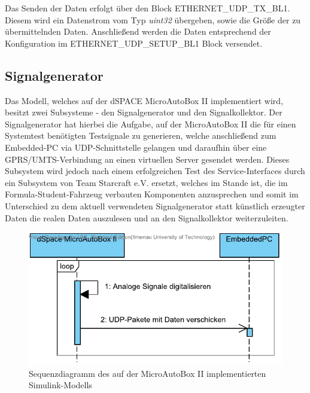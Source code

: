 \documentclass[fontsize = 12pt, paper = a4]{scrreprt}
\begin{document}
\begin{itemize}
Das Senden der Daten erfolgt über den Block ETHERNET\_UDP\_TX\_BL1. Diesem wird ein Datenstrom vom Typ \textit{uint32} übergeben, sowie die Größe der zu übermittelnden Daten. Anschließend werden die Daten entsprechend der Konfiguration im ETHERNET\_UDP\_SETUP\_BL1 Block versendet.



\end{itemize}

\subsection{Signalgenerator}

Das Modell, welches auf der dSPACE MicroAutoBox II implementiert wird, besitzt zwei Subsysteme - den Signalgenerator und den Signalkollektor. Der Signalgenerator hat hierbei die Aufgabe, auf der MicroAutoBox II die für einen Systemtest benötigten Testsignale zu generieren, welche anschließend zum Embedded-PC via UDP-Schnittstelle gelangen und daraufhin über eine GPRS/UMTS-Verbindung an einen virtuellen Server gesendet werden. Dieses Subsystem wird jedoch nach einem erfolgreichen Test des Service-Interfaces durch ein Subsystem von Team Starcraft e.V. ersetzt, welches im Stande ist, die im Formula-Student-Fahrzeug verbauten Komponenten anzusprechen und somit im Unterschied zu dem aktuell verwendeten Signalgenerator statt künstlich erzeugter Daten die realen Daten auszulesen und an den Signalkollektor weiterzuleiten. \vspace*{5mm}

\begin{figure}[h]
\centering
\includegraphics[scale = 1]{opt_autobox}
\caption[Sequenzdiagramm Simulink-Modell]
{Sequenzdiagramm des auf der MicroAutoBox II implementierten Simulink-Modells}
\end{figure}
\end{document}
